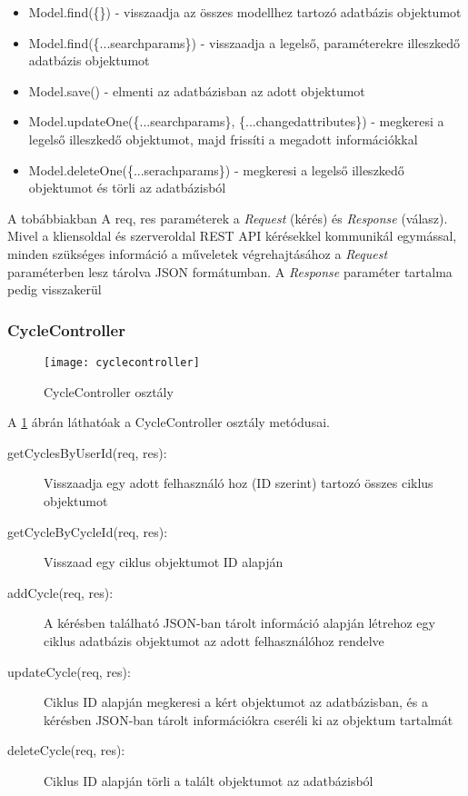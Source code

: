 \begin{itemize}
	\item Model.find(\{\}) - visszaadja az összes modellhez tartozó adatbázis objektumot
	\item Model.find(\{...searchparams\}) - visszaadja a legelső, paraméterekre illeszkedő adatbázis objektumot
	\item Model.save() - elmenti az adatbázisban az adott objektumot
	\item Model.updateOne(\{...searchparams\}, \{...changedattributes\}) - megkeresi a legelső illeszkedő objektumot, majd frissíti a megadott információkkal
	\item Model.deleteOne(\{...serachparams\}) - megkeresi a legelső illeszkedő objektumot és törli az adatbázisból
\end{itemize}

A tobábbiakban A req, res paraméterek a \emph{Request} (kérés) és \emph{Response} (válasz). Mivel a kliensoldal és szerveroldal REST API kérésekkel kommunikál egymással, minden szükséges információ a műveletek végrehajtásához a \emph{Request} paraméterben lesz tárolva JSON formátumban. A \emph{Response} paraméter tartalma pedig visszakerül 

\subsubsection{CycleController}

\begin{figure}[H]
	\centering
	\texttt{[image: cyclecontroller]}
	\caption{CycleController osztály}
	\label{fig:cyclecontroller}
\end{figure}

A \ref{fig:cyclecontroller} ábrán láthatóak a CycleController osztály metódusai.

\begin{description}
	\item[getCyclesByUserId(req, res):] Visszaadja egy adott felhasználó hoz (ID szerint) tartozó összes ciklus objektumot
	\item[getCycleByCycleId(req, res):] Visszaad egy ciklus objektumot ID alapján
	\item[addCycle(req, res):] A kérésben található JSON-ban tárolt információ alapján létrehoz egy ciklus adatbázis objektumot az adott felhasználóhoz rendelve
	\item[updateCycle(req, res):] Ciklus ID alapján megkeresi a kért objektumot az adatbázisban, és a kérésben JSON-ban tárolt információkra cseréli ki az objektum tartalmát
	\item[deleteCycle(req, res):] Ciklus ID alapján törli a talált objektumot az adatbázisból  
\end{description}

